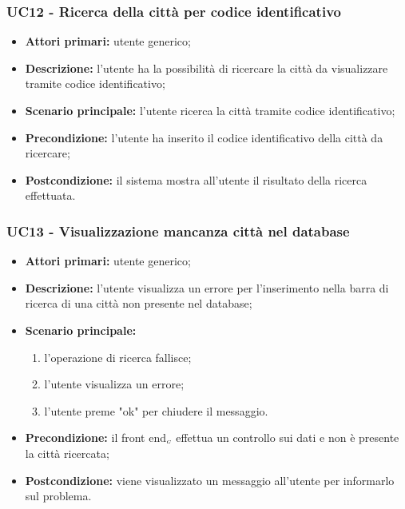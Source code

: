 \subsubsection{UC12 - Ricerca della città per codice identificativo}\label{CasiDUsoCasiDUsoTraUnUtenteEIlFrontEndElencoCasiDUsoUC61RicercaDellaCittàDaVisualizzareTramiteCodiceIdentificativo}
\begin{itemize}
	\item \textbf{Attori primari:} utente generico;
	\item \textbf{Descrizione:} l’utente ha la possibilità di ricercare la città da visualizzare tramite codice identificativo;
	\item \textbf{Scenario principale:} l’utente ricerca la città tramite codice identificativo;
	\item \textbf{Precondizione:} l’utente ha inserito il codice identificativo della città da ricercare;
	\item \textbf{Postcondizione:} il sistema mostra all’utente il risultato della ricerca effettuata.
\end{itemize}



\subsubsection{UC13 - Visualizzazione mancanza città nel database}\label{CasiDUsoCasiDUsoTraUnUtenteEIlFrontEndElencoCasiDUsoUC7VisualizzazioneMessaggioDiMancanzaCittàNelDatabase}

\begin{itemize}
	\item \textbf{Attori primari:} utente generico;
	\item \textbf{Descrizione:} l’utente visualizza un errore per l'inserimento nella barra di ricerca di una città non presente nel database;
	\item \textbf{Scenario principale:}
	\begin{enumerate}
		\item l’operazione di ricerca fallisce;
		\item l’utente visualizza un errore;
		\item l’utente preme "ok" per chiudere il messaggio.
	\end{enumerate}
	\item \textbf{Precondizione:} il front end$_{\scaleto{G}{3pt}}$ effettua un controllo sui dati e non è presente la città ricercata;
	\item \textbf{Postcondizione:} viene visualizzato  un messaggio all’utente per informarlo sul problema.
\end{itemize}


